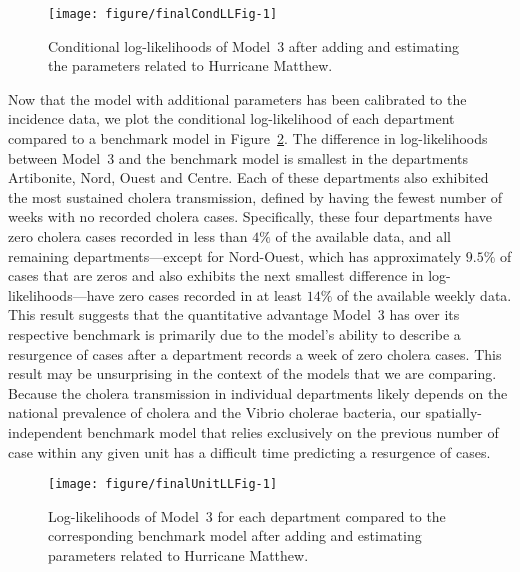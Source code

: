 \begin{figure}[!ht]
\begin{knitrout}
\color{fgcolor}
\texttt{[image: figure/finalCondLLFig-1]} 
\end{knitrout}
\caption[Conditional log-likelihoods with hurricane adjustment]{\label{fig:finalCondLL}Conditional log-likelihoods of Model~3 after adding and estimating the parameters related to Hurricane Matthew.}
\end{figure}

Now that the model with additional parameters has been calibrated to the incidence data, we plot the conditional log-likelihood of each department compared to a benchmark model in Figure~\ref{fig:finalUnitLL}.
The difference in log-likelihoods between Model~3 and the benchmark model is smallest in the departments Artibonite, Nord, Ouest and Centre.
Each of these departments also exhibited the most sustained cholera transmission, defined by having the fewest number of weeks with no recorded cholera cases.
Specifically, these four departments have zero cholera cases recorded in less than $4\%$ of the available data, and all remaining departments---except for Nord-Ouest, which has approximately $9.5\%$ of cases that are zeros and also exhibits the next smallest difference in log-likelihoods---have zero cases recorded in at least $14\%$ of the available weekly data.
This result suggests that the quantitative advantage Model~3 has over its respective benchmark is primarily due to the model's ability to describe a resurgence of cases after a department records a week of zero cholera cases.
This result may be unsurprising in the context of the models that we are comparing.
Because the cholera transmission in individual departments likely depends on the national prevalence of cholera and the Vibrio cholerae bacteria, our spatially-independent benchmark model that relies exclusively on the previous number of case within any given unit has a difficult time predicting a resurgence of cases.

\begin{figure}[!ht]
\begin{knitrout}
\color{fgcolor}

{\centering \texttt{[image: figure/finalUnitLLFig-1]} 

}


\end{knitrout}
\caption{\label{fig:finalUnitLL}Log-likelihoods of Model~3 for each department compared to the corresponding benchmark model after adding and estimating parameters related to Hurricane Matthew.}
\end{figure}

